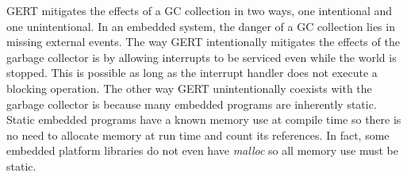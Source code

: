 GERT mitigates the effects of a GC collection in two ways, one intentional
and one unintentional. In an embedded system, the danger of a
GC collection lies in missing external events. The way GERT intentionally mitigates
the effects of the garbage collector is by allowing interrupts to be serviced
even while the world is stopped. This is possible as long as the interrupt
handler does not execute a blocking operation. The other way GERT unintentionally
coexists with the garbage collector is because many embedded programs are
inherently static. Static embedded programs have a known memory use at compile time so
there is no need to allocate memory at run time and count its references. In fact, some embedded
platform libraries do not even have \textit{malloc} so all memory use must be static.



